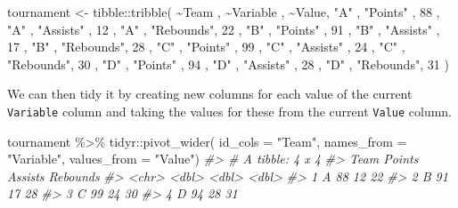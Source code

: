 \documentclass[
  12pt,
]{book}
\newenvironment{Shaded}{\begin{snugshade}}{\end{snugshade}}
\newcommand{\AttributeTok}[1]{\textcolor[rgb]{0.77,0.63,0.00}{#1}}
\newcommand{\CommentTok}[1]{\textcolor[rgb]{0.56,0.35,0.01}{\textit{#1}}}
\newcommand{\DecValTok}[1]{\textcolor[rgb]{0.00,0.00,0.81}{#1}}
\newcommand{\FunctionTok}[1]{\textcolor[rgb]{0.00,0.00,0.00}{#1}}
\newcommand{\NormalTok}[1]{#1}
\newcommand{\OtherTok}[1]{\textcolor[rgb]{0.56,0.35,0.01}{#1}}
\newcommand{\SpecialCharTok}[1]{\textcolor[rgb]{0.00,0.00,0.00}{#1}}
\newcommand{\StringTok}[1]{\textcolor[rgb]{0.31,0.60,0.02}{#1}}
\begin{document}
\begin{Shaded}
\begin{Highlighting}[]
\NormalTok{tournament }\OtherTok{\textless{}{-}}\NormalTok{ tibble}\SpecialCharTok{::}\FunctionTok{tribble}\NormalTok{(}
\SpecialCharTok{\textasciitilde{}}\NormalTok{Team  , }\SpecialCharTok{\textasciitilde{}}\NormalTok{Variable , }\SpecialCharTok{\textasciitilde{}}\NormalTok{Value,}
\StringTok{"A"}\NormalTok{    , }\StringTok{"Points"}\NormalTok{  , }\DecValTok{88}\NormalTok{    ,}
\StringTok{"A"}\NormalTok{    , }\StringTok{"Assists"}\NormalTok{ , }\DecValTok{12}\NormalTok{    ,}
\StringTok{"A"}\NormalTok{    , }\StringTok{"Rebounds"}\NormalTok{, }\DecValTok{22}\NormalTok{    ,}
\StringTok{"B"}\NormalTok{    , }\StringTok{"Points"}\NormalTok{  , }\DecValTok{91}\NormalTok{    ,}
\StringTok{"B"}\NormalTok{    , }\StringTok{"Assists"}\NormalTok{ , }\DecValTok{17}\NormalTok{    ,}
\StringTok{"B"}\NormalTok{    , }\StringTok{"Rebounds"}\NormalTok{, }\DecValTok{28}\NormalTok{    ,}
\StringTok{"C"}\NormalTok{    , }\StringTok{"Points"}\NormalTok{  , }\DecValTok{99}\NormalTok{    ,}
\StringTok{"C"}\NormalTok{    , }\StringTok{"Assists"}\NormalTok{ , }\DecValTok{24}\NormalTok{    ,}
\StringTok{"C"}\NormalTok{    , }\StringTok{"Rebounds"}\NormalTok{, }\DecValTok{30}\NormalTok{    ,}
\StringTok{"D"}\NormalTok{    , }\StringTok{"Points"}\NormalTok{  , }\DecValTok{94}\NormalTok{    ,}
\StringTok{"D"}\NormalTok{    , }\StringTok{"Assists"}\NormalTok{ , }\DecValTok{28}\NormalTok{    ,}
\StringTok{"D"}\NormalTok{    , }\StringTok{"Rebounds"}\NormalTok{, }\DecValTok{31}\NormalTok{    )}
\end{Highlighting}
\end{Shaded}

We can then tidy it by creating new columns for each value of the current \texttt{Variable} column and taking the values for these from the current \texttt{Value} column.

\begin{Shaded}
\begin{Highlighting}[]
\NormalTok{tournament }\SpecialCharTok{\%\textgreater{}\%} 
\NormalTok{  tidyr}\SpecialCharTok{::}\FunctionTok{pivot\_wider}\NormalTok{(}
    \AttributeTok{id\_cols =} \StringTok{"Team"}\NormalTok{, }
    \AttributeTok{names\_from =} \StringTok{"Variable"}\NormalTok{,}
    \AttributeTok{values\_from =} \StringTok{"Value"}\NormalTok{)}
\CommentTok{\#\textgreater{} \# A tibble: 4 x 4}
\CommentTok{\#\textgreater{}   Team  Points Assists Rebounds}
\CommentTok{\#\textgreater{}   \textless{}chr\textgreater{}  \textless{}dbl\textgreater{}   \textless{}dbl\textgreater{}    \textless{}dbl\textgreater{}}
\CommentTok{\#\textgreater{} 1 A         88      12       22}
\CommentTok{\#\textgreater{} 2 B         91      17       28}
\CommentTok{\#\textgreater{} 3 C         99      24       30}
\CommentTok{\#\textgreater{} 4 D         94      28       31}
\end{Highlighting}
\end{Shaded}
\end{document}
